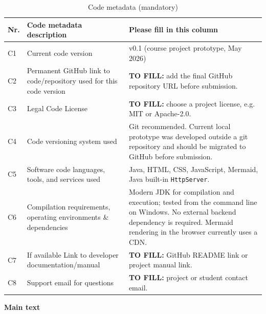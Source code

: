 \documentclass[preprint,12pt,a4paper]{elsarticle}
\begin{document}
\begin{table}[!h]
\begin{tabular}{|l|p{6.2cm}|p{6.2cm}|}
\hline
\textbf{Nr.} & \textbf{Code metadata description} & \textbf{Please fill in this column} \\
\hline
C1 & Current code version & v0.1 (course project prototype, May 2026) \\
\hline
C2 & Permanent GitHub link to code/repository used for this code version & \textbf{TO FILL:} add the final GitHub repository URL before submission. \\
\hline
C3 & Legal Code License & \textbf{TO FILL:} choose a project license, e.g. MIT or Apache-2.0. \\
\hline
C4 & Code versioning system used & Git recommended. Current local prototype was developed outside a git repository and should be migrated to GitHub before submission. \\
\hline
C5 & Software code languages, tools, and services used & Java, HTML, CSS, JavaScript, Mermaid, Java built-in \texttt{HttpServer}. \\
\hline
C6 & Compilation requirements, operating environments \& dependencies & Modern JDK for compilation and execution; tested from the command line on Windows. No external backend dependency is required. Mermaid rendering in the browser currently uses a CDN. \\
\hline
C7 & If available Link to developer documentation/manual & \textbf{TO FILL:} GitHub README link or project manual link. \\
\hline
C8 & Support email for questions & \textbf{TO FILL:} project or student contact email. \\
\hline
\end{tabular}
\caption{Code metadata (mandatory)}
\end{table}

\textbf{Main text}\\
\end{document}
